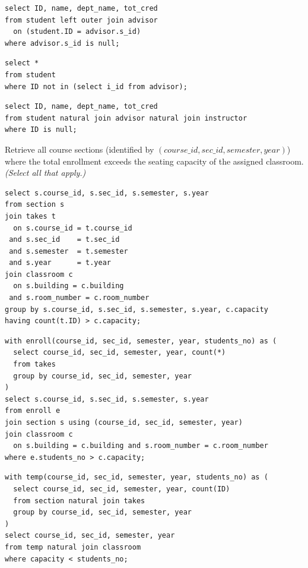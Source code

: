 \documentclass[12pt]{exam}
\begin{document}
\begin{questions}
\begin{choices}
  \CorrectChoice
\begin{verbatim}
select ID, name, dept_name, tot_cred
from student left outer join advisor
  on (student.ID = advisor.s_id)
where advisor.s_id is null;
\end{verbatim}

  \choice
\begin{verbatim}
select *
from student
where ID not in (select i_id from advisor);
\end{verbatim}

  \choice
\begin{verbatim}
select ID, name, dept_name, tot_cred
from student natural join advisor natural join instructor
where ID is null;
\end{verbatim}

\end{choices}

\question[4] Retrieve all course sections (identified by \((\mathit{course\_id}, \mathit{sec\_id}, \mathit{semester}, \mathit{year})\)) where the total enrollment exceeds the seating capacity of the assigned classroom. \emph{(Select all that apply.)}

\begin{choices}

  \CorrectChoice
\begin{verbatim}
select s.course_id, s.sec_id, s.semester, s.year
from section s
join takes t
  on s.course_id = t.course_id
 and s.sec_id    = t.sec_id
 and s.semester  = t.semester
 and s.year      = t.year
join classroom c
  on s.building = c.building
 and s.room_number = c.room_number
group by s.course_id, s.sec_id, s.semester, s.year, c.capacity
having count(t.ID) > c.capacity;
\end{verbatim}

  \CorrectChoice
\begin{verbatim}
with enroll(course_id, sec_id, semester, year, students_no) as (
  select course_id, sec_id, semester, year, count(*)
  from takes
  group by course_id, sec_id, semester, year
)
select s.course_id, s.sec_id, s.semester, s.year
from enroll e
join section s using (course_id, sec_id, semester, year)
join classroom c
  on s.building = c.building and s.room_number = c.room_number
where e.students_no > c.capacity;
\end{verbatim}

  \choice
\begin{verbatim}
with temp(course_id, sec_id, semester, year, students_no) as (
  select course_id, sec_id, semester, year, count(ID)
  from section natural join takes
  group by course_id, sec_id, semester, year
)
select course_id, sec_id, semester, year
from temp natural join classroom
where capacity < students_no;
\end{verbatim}


\end{choices}
\end{questions}
\end{document}
